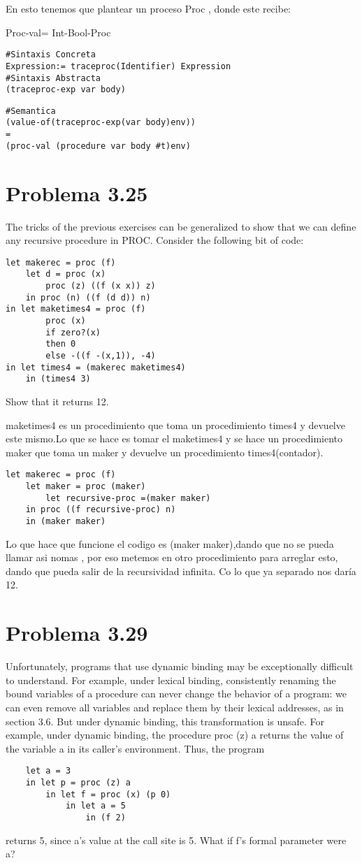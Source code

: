 \documentclass{article}
\begin{document}
En esto tenemos que plantear un proceso Proc , donde este recibe:

Proc-val= Int-Bool-Proc 
\begin{lstlisting}
#Sintaxis Concreta
Expression:= traceproc(Identifier) Expression
#Sintaxis Abstracta
(traceproc-exp var body)
\end{lstlisting}
\begin{lstlisting}
#Semantica
(value-of(traceproc-exp(var body)env))
=
(proc-val (procedure var body #t)env)
\end{lstlisting}
\section{Problema 3.25}
The tricks of the previous exercises can be generalized to show that
we can define any recursive procedure in PROC. Consider the following bit of code:
\begin{lstlisting}
let makerec = proc (f)
    let d = proc (x)
        proc (z) ((f (x x)) z)
    in proc (n) ((f (d d)) n)
in let maketimes4 = proc (f)
        proc (x)
        if zero?(x)
        then 0
        else -((f -(x,1)), -4)
in let times4 = (makerec maketimes4)
    in (times4 3)
\end{lstlisting}
Show that it returns 12.

maketimes4 es un procedimiento que toma un procedimiento times4 y devuelve este mismo.Lo que se hace es tomar el maketimes4 y se hace un procedimiento maker que toma un maker y devuelve un procedimiento times4(contador).
\begin{lstlisting}
let makerec = proc (f)
    let maker = proc (maker)
        let recursive-proc =(maker maker)
    in proc ((f recursive-proc) n)
    in (maker maker)
\end{lstlisting}
Lo que hace que funcione el codigo es  (maker maker),dando que no se pueda llamar asi nomas , por eso metemos en otro procedimiento para arreglar esto, dando que pueda salir de la recursividad infinita.
Co lo que ya separado nos daría 12.
\section{Problema 3.29}
Unfortunately, programs that use dynamic binding may be exceptionally
difficult to understand. For example, under lexical binding, consistently
renaming the bound variables of a procedure can never change the behavior of a program:
we can even remove all variables and replace them by their lexical addresses,
as in section 3.6. But under dynamic binding, this transformation is unsafe.
For example, under dynamic binding, the procedure proc (z) a returns the value
of the variable a in its caller’s environment. Thus, the program
\begin{lstlisting}
    let a = 3
    in let p = proc (z) a
	    in let f = proc (x) (p 0)
		    in let a = 5
			    in (f 2)
\end{lstlisting}
returns 5, since a’s value at the call site is 5. What if f’s formal parameter were a?
\end{document}
